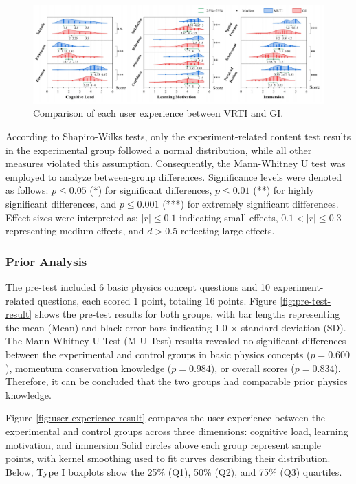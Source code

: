 \documentclass[runningheads]{llncs}
\begin{document}
\begin{figure}[t]
  \centering
  \includegraphics[width=\textwidth]{image/three-user-experience-result.pdf} %
  \caption{Comparison of each user experience between VRTI and GI.}
  \label{fig:three-user-experience-result}
\end{figure}

According to Shapiro-Wilks tests, only the experiment-related content test results in the experimental group followed a normal distribution, while all other measures violated this assumption. Consequently, the Mann-Whitney U test was employed to analyze between-group differences. Significance levels were denoted as follows: $p \le 0.05$ (*) for significant differences, $p \le 0.01$ (**) for highly significant differences, and $p \le 0.001$ (***) for extremely significant differences. Effect sizes were interpreted as: $|r| \le 0.1$ indicating small effects, $0.1 < |r| \le  0.3$ representing medium effects, and $d > 0.5$ reflecting large effects.

\subsubsection{Prior Analysis}
The pre-test included 6 basic physics concept questions and 10 experiment-related questions, each scored 1 point, totaling 16 points. Figure \ref{fig:pre-test-result} shows the pre-test results for both groups, with bar lengths representing the mean (Mean) and black error bars indicating 1.0 × standard deviation (SD). The Mann-Whitney U Test (M-U Test) results revealed no significant differences between the experimental and control groups in basic physics concepts ($p=0.600$), momentum conservation knowledge ($p=0.984$), or overall scores ($p=0.834$). Therefore, it can be concluded that the two groups had comparable prior physics knowledge.

Figure \ref{fig:user-experience-result} compares the user experience between the experimental and control groups across three dimensions: cognitive load, learning motivation, and immersion.Solid circles above each group represent sample points, with kernel smoothing used to fit curves describing their distribution. Below, Type I boxplots show the 25\% (Q1), 50\% (Q2), and 75\% (Q3) quartiles.
\end{document}
